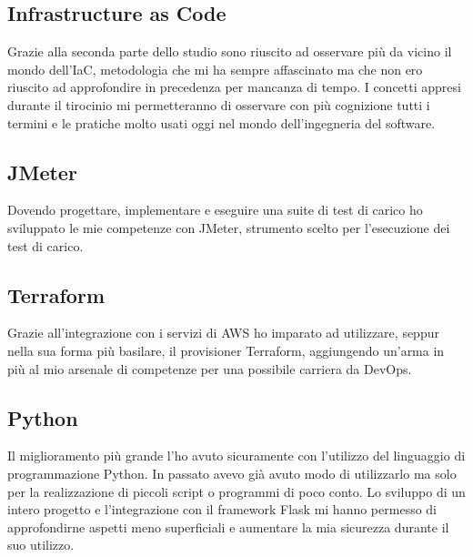 \subsection{Infrastructure as Code}
Grazie alla seconda parte dello studio sono riuscito ad osservare più da vicino il mondo dell'IaC, metodologia che mi ha sempre affascinato ma che non ero riuscito ad approfondire in precedenza per mancanza di tempo. I concetti appresi durante il tirocinio mi permetteranno di osservare con più cognizione tutti i termini e le pratiche molto usati oggi nel mondo dell'ingegneria del software. 
\subsection{JMeter}
Dovendo progettare, implementare e eseguire una suite di test di carico ho sviluppato le mie competenze con JMeter, strumento scelto per l'esecuzione dei test di carico.
\subsection{Terraform}
Grazie all'integrazione con i servizi di AWS ho imparato ad utilizzare, seppur nella sua forma più basilare, il provisioner Terraform, aggiungendo un'arma in più al mio arsenale di competenze per una possibile carriera da DevOps.
\subsection{Python}
Il miglioramento più grande l'ho avuto sicuramente con l'utilizzo del linguaggio di programmazione Python. In passato avevo già avuto modo di utilizzarlo ma solo per la realizzazione di piccoli script o programmi di poco conto. Lo sviluppo di un intero progetto e l'integrazione con il \gls{framework} Flask mi hanno permesso di approfondirne aspetti meno superficiali e aumentare la mia sicurezza durante il suo utilizzo. 
